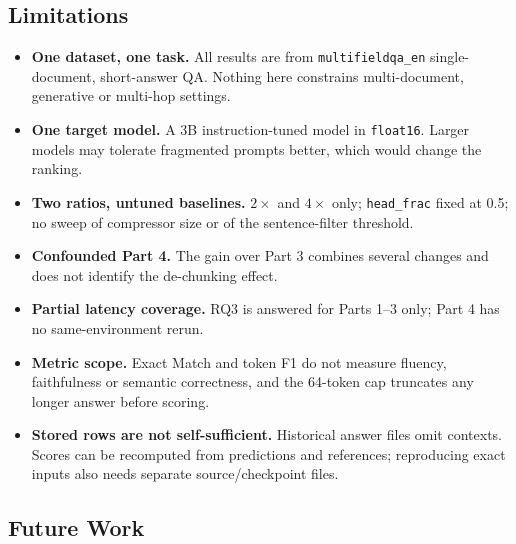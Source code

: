 ﻿\documentclass[10pt,a4paper,twocolumn]{article}
\newcommand{\MFQA}{\texttt{multifieldqa\_\allowbreak en}}
\begin{document}
\subsection{Limitations}
\label{sec:limitations}

\begin{itemize}
  \item \textbf{One dataset, one task.} All results are from
  \MFQA{} single-document, short-answer QA. Nothing here
  constrains multi-document, generative or multi-hop settings.
  \item \textbf{One target model.} A 3B instruction-tuned model in
  \texttt{float16}. Larger models may tolerate fragmented prompts better, which
  would change the ranking.
  \item \textbf{Two ratios, untuned baselines.} $2\times$ and $4\times$ only;
  \texttt{head\_frac} fixed at 0.5; no sweep of compressor size or of the
  sentence-filter threshold.
  \item \textbf{Confounded Part 4.} The gain over Part 3 combines several changes and does not identify the de-chunking effect.
  \item \textbf{Partial latency coverage.} RQ3 is answered for Parts 1--3 only;
  Part 4 has no same-environment rerun.
  \item \textbf{Metric scope.} Exact Match and token F1 do not measure fluency,
  faithfulness or semantic correctness, and the 64-token cap truncates any longer
  answer before scoring.
  \item \textbf{Stored rows are not self-sufficient.} Historical answer files omit contexts. Scores can be recomputed from predictions and references; reproducing exact inputs also needs separate source/checkpoint files.
\end{itemize}

\subsection{Future Work}
\label{sec:future}
\end{document}
